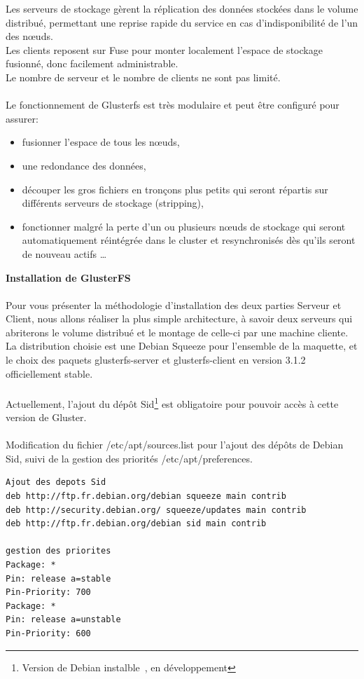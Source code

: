\documentclass[12pt]{report}
\begin{document}
Les serveurs de stockage gèrent la réplication des données stockées dans le volume distribué, permettant une reprise rapide du service en cas d'indisponibilité de l'un des n\oe uds. \\
Les clients reposent sur Fuse pour monter localement l'espace de stockage fusionné, donc facilement administrable.\\
Le nombre de serveur et le nombre de clients ne sont pas limité.\\\\
Le fonctionnement de Glusterfs est très modulaire et peut être configuré pour assurer:\\
	\begin{itemize}
		\item fusionner l'espace de tous les nœuds,
		\item une redondance des données,
		\item découper les gros fichiers en tronçons plus petits qui seront répartis sur différents serveurs de stockage (stripping),
		\item fonctionner malgré la perte d'un ou plusieurs nœuds de stockage qui seront automatiquement réintégrée dans le cluster et resynchronisés dès qu'ils seront de nouveau actifs \dots \\
	\end{itemize}
\textbf{Installation de GlusterFS}\\\\
Pour vous présenter la méthodologie d'installation des deux parties Serveur et Client, nous allons réaliser la plus simple architecture, à savoir deux serveurs qui abriterons le volume distribué et le montage de celle-ci par une machine cliente.\\
La distribution choisie est une Debian Squeeze pour l'ensemble de la maquette, et le choix des paquets glusterfs-server et glusterfs-client en version 3.1.2 officiellement stable.\\\\
Actuellement, l'ajout du dépôt Sid\footnote{Version de Debian \og instalble\fg~, en développement} est obligatoire pour pouvoir accès à cette version de Gluster.\\\\
Modification du fichier /etc/apt/sources.list pour l'ajout des dépôts de Debian Sid, suivi de la gestion des priorités /etc/apt/preferences.
\begin{lstlisting}
Ajout des depots Sid
deb http://ftp.fr.debian.org/debian squeeze main contrib
deb http://security.debian.org/ squeeze/updates main contrib
deb http://ftp.fr.debian.org/debian sid main contrib

gestion des priorites
Package: *
Pin: release a=stable
Pin-Priority: 700
Package: *
Pin: release a=unstable
Pin-Priority: 600
	  \end{lstlisting}
\end{document}

